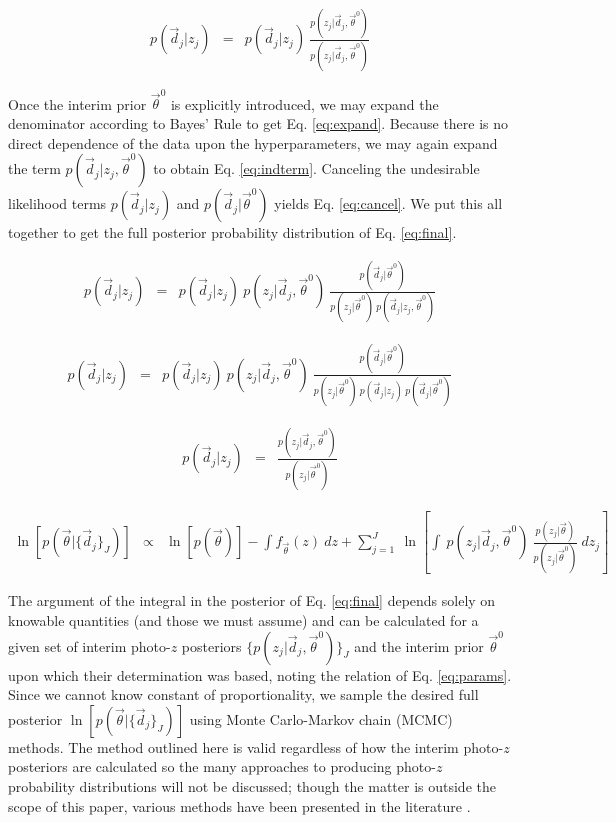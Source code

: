 \documentclass[preprint]{aastex}
\begin{document}
\begin{eqnarray}
\label{eq:trick}
p(\vec{d}_{j}|z_{j}) &=& p(\vec{d}_{j}|z_{j})\ 
\frac{p(z_{j}|\vec{d}_{j},\vec{\theta}^{0})}{p(z_{j}|\vec{d}_{j},\vec{\theta}^{0
})}
\end{eqnarray}

Once the interim prior $\vec{\theta}^{0}$ is explicitly introduced, we may 
expand the denominator according to Bayes' Rule to get Eq. \ref{eq:expand}.  
Because there is no direct dependence of the data upon the hyperparameters, we 
may again expand the term $p(\vec{d}_{j}|z_{j},\vec{\theta}^{0})$ to obtain Eq. 
\ref{eq:indterm}.  Canceling the undesirable likelihood terms 
$p(\vec{d}_{j}|z_{j})$ and $p(\vec{d}_{j}|\vec{\theta}^{0})$ yields Eq. 
\ref{eq:cancel}.  We put this all together to get the full posterior 
probability distribution of Eq. \ref{eq:final}.

\begin{eqnarray}
\label{eq:expand}
p(\vec{d}_{j}|z_{j}) &=& p(\vec{d}_{j}|z_{j})\ 
p(z_{j}|\vec{d}_{j},\vec{\theta}^{0})\ 
\frac{p(\vec{d}_{j}|\vec{\theta}^{0})}{p(z_{j}|\vec{\theta}^{0})\ 
p(\vec{d}_{j}|z_{j},\vec{\theta}^{0})}
\end{eqnarray}

\begin{eqnarray}
\label{eq:indterm}
p(\vec{d}_{j}|z_{j}) &=& p(\vec{d}_{j}|z_{j})\ 
p(z_{j}|\vec{d}_{j},\vec{\theta}^{0})\ 
\frac{p(\vec{d}_{j}|\vec{\theta}^{0})}{p(z_{j}|\vec{\theta}^{0})\ 
p(\vec{d}_{j}|z_{j})\ p(\vec{d}_{j}|\vec{\theta}^{0})}
\end{eqnarray}

\begin{eqnarray}
\label{eq:cancel}
p(\vec{d}_{j}|z_{j}) &=& 
\frac{p(z_{j}|\vec{d}_{j},\vec{\theta}^{0})}{p(z_{j}|\vec{\theta}^{0})}
\end{eqnarray}

\begin{eqnarray}
\label{eq:final}
\ln[p(\vec{\theta}|\{\vec{d}_{j}\}_{J})] &\propto& \ln[p(\vec{\theta})]-\int 
f_{\vec{\theta}}(z)\ dz + \sum_{j=1}^{J}\ \ln\left[\int\ 
p(z_{j}|\vec{d}_{j},\vec{\theta}^{0})\ 
\frac{p(z_{j}|\vec{\theta})}{p(z_{j}|\vec{\theta}^{0})}\ dz_{j}\right]
\end{eqnarray}

The argument of the integral in the posterior of Eq. \ref{eq:final} depends 
solely on knowable quantities (and those we must assume) and can be calculated 
for a given set of interim photo-$z$ posteriors 
$\{p(z_{j}|\vec{d}_{j},\vec{\theta}^{0})\}_{J}$ and the interim prior 
$\vec{\theta}^{0}$ upon which their determination was based, noting the 
relation of Eq. \ref{eq:params}.  Since we cannot know constant of 
proportionality, we sample the desired full posterior 
$\ln[p(\vec{\theta}|\{\vec{d}_{j}\}_{J})]$ using Monte Carlo-Markov chain 
(MCMC) methods.  The method outlined here is valid regardless of how the 
interim photo-$z$ posteriors are calculated so the many approaches to producing 
photo-$z$ probability distributions will not be discussed; though the matter is 
outside the scope of this paper, various methods have been presented in the 
literature \citep{Sheldon2012, Ball2008, CarrascoKind2013, CarrascoKind2014a}.
\end{document}
